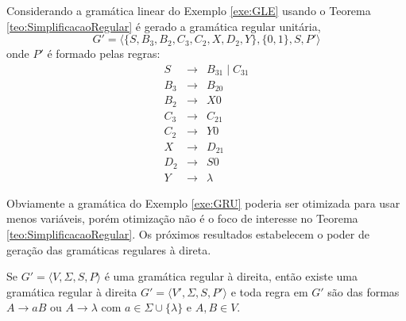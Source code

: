 \begin{exemplo}\label{exe:GRU}
	Considerando a gramática linear do Exemplo \ref{exe:GLE} usando o Teorema \ref{teo:SimplificacaoRegular} é gerado a gramática regular unitária, 
	$$G' = \langle \{S, B_3, B_2, C_3, C_2, X, D_2, Y\}, \{0, 1\}, S, P'\rangle$$ 
	onde $P'$ é formado pelas regras:
	\begin{eqnarray*}
		S & \rightarrow & B_31 \mid C_31\\
		B_3 & \rightarrow & B_20\\
		B_2 & \rightarrow & X0\\
		C_3 & \rightarrow & C_21\\
		C_2 & \rightarrow & Y0\\
		X & \rightarrow & D_21\\
		D_2 & \rightarrow& S0\\
		Y & \rightarrow & \lambda
	\end{eqnarray*}
\end{exemplo}

Obviamente a gramática do Exemplo \ref{exe:GRU} poderia ser otimizada para usar menos variáveis, porém otimização não é o foco de interesse no Teorema \ref{teo:SimplificacaoRegular}. Os próximos resultados estabelecem o poder de geração das gramáticas regulares à direta.

\begin{lema}\label{lema:SimplificacaoRegular}
	Se $G' = \langle V, \Sigma, S, P\rangle$ é uma gramática regular à direita, então existe uma gramática regular à direita $G' = \langle V', \Sigma, S, P'\rangle$ e toda regra em $G'$ são das formas $A \rightarrow aB$ ou $A \rightarrow \lambda$ com $a \in \Sigma \cup \{\lambda\}$ e $A, B \in V$.
\end{lema}

